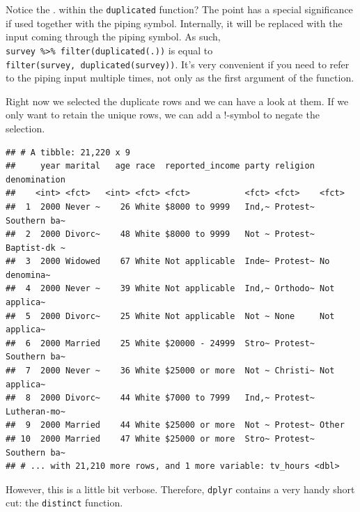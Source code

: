\documentclass[]{tufte-book}
\newenvironment{Shaded}{}{}
\newcommand{\KeywordTok}[1]{\textcolor[rgb]{0.00,0.44,0.13}{\textbf{#1}}}
\newcommand{\NormalTok}[1]{#1}
\newcommand{\OperatorTok}[1]{\textcolor[rgb]{0.40,0.40,0.40}{#1}}
\newcommand{\StringTok}[1]{\textcolor[rgb]{0.25,0.44,0.63}{#1}}
\begin{document}
Notice the . within the \texttt{duplicated} function? The point has a special significance if used together with the piping symbol. Internally, it will be replaced with the input coming through the piping symbol. As such, \texttt{survey\ \%\textgreater{}\%\ filter(duplicated(.))} is equal to \texttt{filter(survey,\ duplicated(survey))}. It's very convenient if you need to refer to the piping input multiple times, not only as the first argument of the function.

Right now we selected the duplicate rows and we can have a look at them. If we only want to retain the unique rows, we can add a !-symbol to negate the selection.

\begin{Shaded}
\end{Shaded}

\begin{verbatim}
## # A tibble: 21,220 x 9
##     year marital   age race  reported_income party religion denomination
##    <int> <fct>   <int> <fct> <fct>           <fct> <fct>    <fct>       
##  1  2000 Never ~    26 White $8000 to 9999   Ind,~ Protest~ Southern ba~
##  2  2000 Divorc~    48 White $8000 to 9999   Not ~ Protest~ Baptist-dk ~
##  3  2000 Widowed    67 White Not applicable  Inde~ Protest~ No denomina~
##  4  2000 Never ~    39 White Not applicable  Ind,~ Orthodo~ Not applica~
##  5  2000 Divorc~    25 White Not applicable  Not ~ None     Not applica~
##  6  2000 Married    25 White $20000 - 24999  Stro~ Protest~ Southern ba~
##  7  2000 Never ~    36 White $25000 or more  Not ~ Christi~ Not applica~
##  8  2000 Divorc~    44 White $7000 to 7999   Ind,~ Protest~ Lutheran-mo~
##  9  2000 Married    44 White $25000 or more  Not ~ Protest~ Other       
## 10  2000 Married    47 White $25000 or more  Stro~ Protest~ Southern ba~
## # ... with 21,210 more rows, and 1 more variable: tv_hours <dbl>
\end{verbatim}

However, this is a little bit verbose. Therefore, \texttt{dplyr} contains a very handy short cut: the \texttt{distinct} function.

\begin{Shaded}
\end{Shaded}
\end{document}
